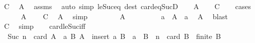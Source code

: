 \begin{isabellebody}
\ {\isacharquery}{\kern0pt}C\ \isamarkupfalse%
\ {\isacharquery}{\kern0pt}A\ \isamarkupfalse%
\ assms\ \isamarkupfalse%
\ {\isacharparenleft}{\kern0pt}auto\ simp{\isacharcolon}{\kern0pt}\ le{\isacharunderscore}{\kern0pt}Suc{\isacharunderscore}{\kern0pt}eq\ dest{\isacharcolon}{\kern0pt}\ card{\isacharunderscore}{\kern0pt}eq{\isacharunderscore}{\kern0pt}SucD{\isacharparenright}{\kern0pt}\isanewline
{}\isamarkupfalse%
\isanewline
\ \ \isamarkupfalse%
\ {\isacharquery}{\kern0pt}A\isanewline
\ \ \isamarkupfalse%
\ {\isacharquery}{\kern0pt}C\isanewline
\ \ \isamarkupfalse%
\ cases\isanewline
\ \ \ \ \isamarkupfalse%
\ {\isachardoublequoteopen}A\ {\isacharequal}{\kern0pt}\ {\isacharbraceleft}{\kern0pt}{\isacharbraceright}{\kern0pt}{\isachardoublequoteclose}\ \isamarkupfalse%
\ {\isacharquery}{\kern0pt}C\ \isamarkupfalse%
\ {\isacartoucheopen}{\isacharquery}{\kern0pt}A{\isacartoucheclose}\ \isamarkupfalse%
\ simp\isanewline
\ \ \isamarkupfalse%
\isanewline
\ \ \ \ \isamarkupfalse%
\ {\isachardoublequoteopen}A\ {\isasymnoteq}\ {\isacharbraceleft}{\kern0pt}{\isacharbraceright}{\kern0pt}{\isachardoublequoteclose}\isanewline
\ \ \ \ \isamarkupfalse%
\ \isamarkupfalse%
\ a\ \ {\isachardoublequoteopen}A\ {\isacharequal}{\kern0pt}\ {\isacharbraceleft}{\kern0pt}a{\isacharbraceright}{\kern0pt}{\isachardoublequoteclose}\ \isamarkupfalse%
\ {\isacartoucheopen}{\isacharquery}{\kern0pt}A{\isacartoucheclose}\ \isamarkupfalse%
\ blast\isanewline
\ \ \ \ \isamarkupfalse%
\ {\isacharquery}{\kern0pt}C\ \isamarkupfalse%
\ simp\isanewline
\ \ \isamarkupfalse%
\isanewline
{}\isamarkupfalse%
%
\endisatagproof
{\isafoldproof}%
%
\isadelimproof
\isanewline
%
\endisadelimproof
\isanewline
{}\isamarkupfalse%
\ card{\isacharunderscore}{\kern0pt}le{\isacharunderscore}{\kern0pt}Suc{\isacharunderscore}{\kern0pt}iff{\isacharcolon}{\kern0pt}\isanewline
\ \ {\isachardoublequoteopen}Suc\ n\ {\isasymle}\ card\ A\ {\isacharequal}{\kern0pt}\ {\isacharparenleft}{\kern0pt}{\isasymexists}a\ B{\isachardot}{\kern0pt}\ A\ {\isacharequal}{\kern0pt}\ insert\ a\ B\ {\isasymand}\ a\ {\isasymnotin}\ B\ {\isasymand}\ n\ {\isasymle}\ card\ B\ {\isasymand}\ finite\ B{\isacharparenright}{\kern0pt}{\isachardoublequoteclose}\isanewline

\end{isabellebody}
